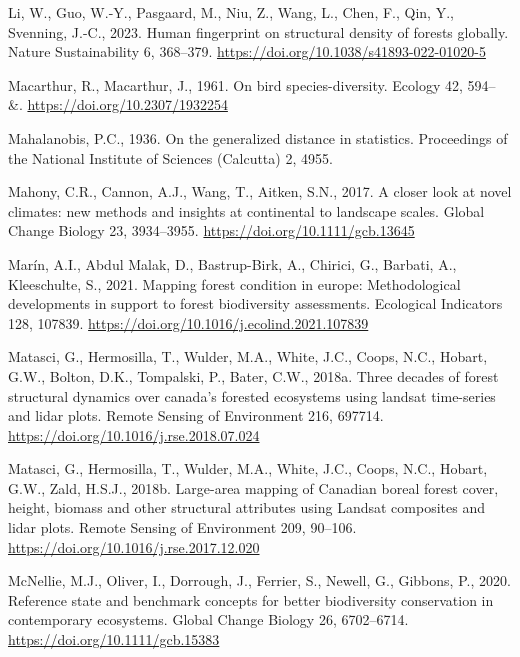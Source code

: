 \documentclass[
]{agujournal2019}
\newlength{\cslhangindent}
\newenvironment{CSLReferences}[2] %
 {\begin{list}{}{%
  \setlength{\itemindent}{0pt}
  \setlength{\leftmargin}{0pt}
  \setlength{\parsep}{0pt}
  \ifodd #1
   \setlength{\leftmargin}{\cslhangindent}
   \setlength{\itemindent}{-1\cslhangindent}
  \fi
  \setlength{\itemsep}{#2\baselineskip}}}
 {\end{list}}
\begin{document}
\begin{CSLReferences}{1}{0}
Li, W., Guo, W.-Y., Pasgaard, M., Niu, Z., Wang, L., Chen, F., Qin, Y.,
Svenning, J.-C., 2023. Human fingerprint on structural density of
forests globally. Nature Sustainability 6, 368--379.
\url{https://doi.org/10.1038/s41893-022-01020-5}

Macarthur, R., Macarthur, J., 1961. On bird species-diversity. Ecology
42, 594-- \&. \url{https://doi.org/10.2307/1932254}

Mahalanobis, P.C., 1936. On the generalized distance in statistics.
Proceedings of the National Institute of Sciences (Calcutta) 2, 4955.

Mahony, C.R., Cannon, A.J., Wang, T., Aitken, S.N., 2017. A closer look
at novel climates: new methods and insights at continental to landscape
scales. Global Change Biology 23, 3934--3955.
\url{https://doi.org/10.1111/gcb.13645}

Marín, A.I., Abdul Malak, D., Bastrup-Birk, A., Chirici, G., Barbati,
A., Kleeschulte, S., 2021. Mapping forest condition in europe:
Methodological developments in support to forest biodiversity
assessments. Ecological Indicators 128, 107839.
\url{https://doi.org/10.1016/j.ecolind.2021.107839}

Matasci, G., Hermosilla, T., Wulder, M.A., White, J.C., Coops, N.C.,
Hobart, G.W., Bolton, D.K., Tompalski, P., Bater, C.W., 2018a. Three
decades of forest structural dynamics over canada's forested ecosystems
using landsat time-series and lidar plots. Remote Sensing of Environment
216, 697714. \url{https://doi.org/10.1016/j.rse.2018.07.024}

Matasci, G., Hermosilla, T., Wulder, M.A., White, J.C., Coops, N.C.,
Hobart, G.W., Zald, H.S.J., 2018b. Large-area mapping of Canadian boreal
forest cover, height, biomass and other structural attributes using
Landsat composites and lidar plots. Remote Sensing of Environment 209,
90--106. \url{https://doi.org/10.1016/j.rse.2017.12.020}

McNellie, M.J., Oliver, I., Dorrough, J., Ferrier, S., Newell, G.,
Gibbons, P., 2020. Reference state and benchmark concepts for better
biodiversity conservation in contemporary ecosystems. Global Change
Biology 26, 6702--6714. \url{https://doi.org/10.1111/gcb.15383}


\end{CSLReferences}
\end{document}
